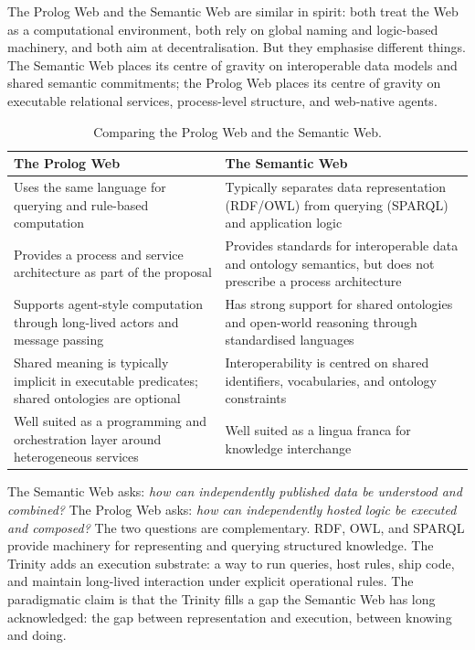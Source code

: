 The Prolog Web and the Semantic Web are similar in spirit: both treat
the Web as a computational environment, both rely on global naming and
logic-based machinery, and both aim at decentralisation. But they
emphasise different things. The Semantic Web places its centre of
gravity on interoperable data models and shared semantic commitments;
the Prolog Web places its centre of gravity on executable relational
services, process-level structure, and web-native agents.

\begin{table}[ht]
\begin{center}
\begin{tabular}{ | p{5.7cm} | p{5.7cm} | }
\hline
\textbf{The Prolog Web} & \textbf{The Semantic Web} \\ \hline
Uses the same language for querying and rule-based computation &
Typically separates data representation (RDF/OWL) from querying
(SPARQL) and application logic \\ \hline
Provides a process and service architecture as part of the proposal &
Provides standards for interoperable data and ontology semantics, but
does not prescribe a process architecture \\ \hline
Supports agent-style computation through long-lived actors and message
passing & Has strong support for shared ontologies and open-world
reasoning through standardised languages \\ \hline
Shared meaning is typically implicit in executable predicates; shared
ontologies are optional & Interoperability is centred on shared
identifiers, vocabularies, and ontology constraints \\ \hline
Well suited as a programming and orchestration layer around
heterogeneous services & Well suited as a lingua franca for knowledge
interchange \\ \hline
\end{tabular}
\end{center}
\caption{Comparing the Prolog Web and the Semantic Web.}
\label{tab:paradigm-wp-sw-comparison}
\end{table}

\noindent The Semantic Web asks: \emph{how can independently published
data be understood and combined?} The Prolog Web asks: \emph{how can
independently hosted logic be executed and composed?} The two questions
are complementary. RDF, OWL, and SPARQL provide machinery for
representing and querying structured knowledge. The Trinity adds an
execution substrate: a way to run queries, host rules, ship code, and
maintain long-lived interaction under explicit operational rules. The
paradigmatic claim is that the Trinity fills a gap the Semantic Web has
long acknowledged: the gap between representation and execution, between
knowing and doing.

